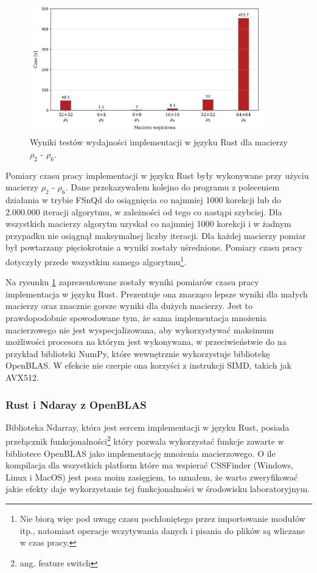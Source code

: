\documentclass[11pt, a4paper]{article}
\begin{document}
\begin{sloppypar}
    \FloatBarrier
    \begin{figure}[ht]
      \centering
      \includegraphics[width=0.9\textwidth]{"resources/rust_performance_tests.png"}
      \caption{Wyniki testów wydajności implementacji w języku Rust dla macierzy $\rho_{2}$ - $\rho
      _{6}$.}
      \label{fourth-perf}
    \end{figure}
    \FloatBarrier

    Pomiary czasu pracy implementacji w języku Rust były wykonywane przy użyciu macierzy
    $\rho_{2}$ - $\rho_{6}$. Dane przekazywałem kolejno do programu z poleceniem działania
    w trybie FSnQd do osiągnięcia co najmniej 1000 korekcji lub do 2.000.000 iteracji
    algorytmu, w zależności od tego co nastąpi szybciej. Dla wszystkich macierzy
    algorytm uzyskał co najmniej 1000 korekcji i w żadnym przypadku nie osiągnął
    maksymalnej liczby iteracji. Dla każdej macierzy pomiar był powtarzany pięciokrotnie
    a wyniki zostały uśrednione. Pomiary czasu pracy dotyczyły przede wszystkim samego
    algorytmu\footnote{Nie biorą więc pod uwagę czasu pochłoniętego przez importowanie modułów
    itp., natomiast operacje wczytywania danych i pisania do plików są wliczane w czas pracy.}.

    Na rysunku \ref{fourth-perf} zaprezentowane zostały wyniki pomiarów czasu pracy implementacja
    w języku Rust. Prezentuje ona znacząco lepsze wyniki dla małych macierzy oraz
    znacznie gorsze wyniki dla dużych macierzy. Jest to prawdopodobnie spowodowane tym,
    że sama implementacja mnożenia macierzowego nie jest wyspecjalizowana, aby wykorzystywać
    maksimum możliwości procesora na którym jest wykonywana, w przeciwieństwie do na
    przykład biblioteki NumPy, które wewnętrznie wykorzystuje bibliotekę OpenBLAS\cite{NumPy_Doc}.
    W efekcie nie czerpie ona korzyści z instrukcji SIMD, takich jak AVX512.

    \subsubsection{ Rust i Ndaray z OpenBLAS }
    Biblioteka Ndarray, która jest sercem implementacji w języku Rust, posiada
    przełącznik funkcjonalności\footnote{ang. feature switch} który pozwala wykorzystać funkcje
    zawarte w bibliotece OpenBLAS jako implementację mnożenia macierzowego. O ile
    kompilacja dla wszystkich platform które ma wspierać CSSFinder (Windows, Linux i
    MacOS) jest poza moim zasięgiem, to uznałem, że warto zweryfikować jakie efekty daje
    wykorzystanie tej funkcjonalności w środowisku laboratoryjnym.


\end{sloppypar}
\end{document}
